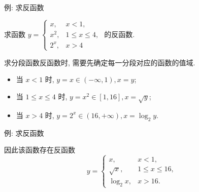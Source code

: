 \begin{frame}{例: 求反函数}
	\onslide<+->
	\begin{example}
		求函数 $y=\begin{cases}
			x,&x<1,\\
			x^2,&1\le x\le 4,\\
			2^x,&x>4
		\end{cases}$ 的反函数.
	\end{example}
	\onslide<+->
	\begin{analysis}
		求分段函数反函数时, 需要先确定每一分段对应的函数的值域.
	\end{analysis}
	\onslide<+->
	\begin{solution}
		\begin{itemize}
			\item 当 $x<1$ 时, $y=x\in(-\infty,1), x=y$;
			\item 当 $1\le x\le 4$ 时, $y=x^2\in[1,16], x=\sqrt y$;
			\item 当 $x>4$ 时, $y=2^x\in(16,+\infty), x=\log_2 y$.
		\end{itemize}
	\end{solution}
\end{frame}


\begin{frame}{例: 求反函数}
	\onslide<+->
	\begin{solution}[续解]
	因此该函数存在反函数
		\[y=\begin{cases}
			x,&x<1,\\
			\sqrt x,&1\le x\le 16,\\
			\log_2 x,&x>16.
		\end{cases}\]
	\end{solution}
\end{frame}

